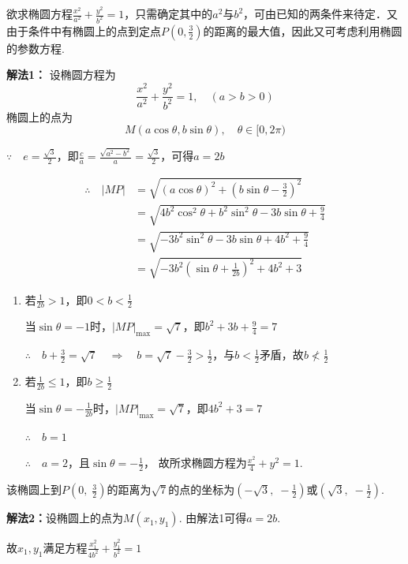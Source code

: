 \begin{analyze}
欲求椭圆方程$\frac{x^2}{a^2}+\frac{y^2}{b^2}=1$，只需确定其中的$a^2$与$b^2$，可由已知的两条件来待定．又由于条件中有椭圆上的点到定点$P\left(0,\frac{3}{2}\right)$的距离的最大值，因此又可考虑利用椭圆的参数方程.
\end{analyze}

\begin{solution}
\textbf{解法1：}    设椭圆方程为$$\frac{x^2}{a^2}+\frac{y^2}{b^2}=1,\quad (a>b>0)$$
椭圆上的点为
\[M(a\cos\theta, b\sin\theta),\quad \theta\in[0,2\pi)\]

$\because\quad e=\frac{\sqrt{3}}{2}$，即$\frac{c}{a}=\frac{\sqrt{a^2-b^2}}{a}=\frac{\sqrt{3}}{2}$，可得$a=2b$

\[\begin{split}
    \therefore\quad |MP|&=\sqrt{\left(a\cos\theta\right)^2+\left(b\sin\theta-\frac{3}{2}\right)^2}\\
    &=\sqrt{4b^2\cos^2\theta+b^2\sin^2\theta-3b\sin\theta+\frac{9}{4}}\\
    &=\sqrt{-3b^2\sin^2\theta-3b\sin\theta+4b^2+\frac{9}{4}}\\
    &=\sqrt{-3b^2\left(\sin\theta+\frac{1}{2b}\right)^2+4b^2+3}
\end{split}\]
\begin{enumerate}[(1)]
    \item 若$\frac{1}{2b}>1$，即$0<b<\frac{1}{2}$
    
    当$\sin\theta=-1$时，$|MP|_{\max}=\sqrt{7}$，即$b^2+3b+\frac{9}{4}=7$

$\therefore\quad b+\frac{3}{2}=\sqrt{7}\quad \Rightarrow\quad b=\sqrt{7}-\frac{3}{2}>\frac{1}{2}$，与$b<\frac{1}{2}$矛盾，故$b\not<\frac{1}{2}$

\item 若$\frac{1}{2b}\le 1$，即$b\ge \frac{1}{2}$
    
当$\sin\theta=-\frac{1}{2b}$时，$|MP|_{\max}=\sqrt{7}$，即$4b^2+3=7$

$\therefore\quad b=1$

$\therefore\quad a=2$，且$\sin\theta=-\frac{1}{2}$，
故所求椭圆方程为$\frac{x^2}{4}+y^2=1$.
\end{enumerate}

该椭圆上到$P\left(0,\; \frac{3}{2}\right)$的距离为$\sqrt{7}$的点的坐标为$\left(-\sqrt{3},\; -\frac{1}{2}\right)$或$\left(\sqrt{3},\; -\frac{1}{2}\right)$.

\textbf{解法2：}设椭圆上的点为$M(x_1,y_1)$. 由解法1可得$a=2b$.

故$x_1,y_1$满足方程$\frac{x^2_1}{4b^2}+\frac{y^2_1}{b^2}=1$


\end{solution}
